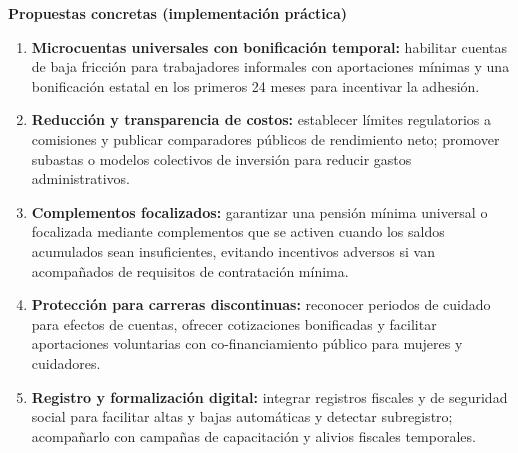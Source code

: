 \documentclass[11pt,letterpaper,oneside]{article}
\begin{document}
\begin{forobox}[title={Participación desarrollada — Temas 2 a 4}]
\medskip
\textbf{Propuestas concretas (implementación práctica)}
\begin{enumerate}
  \item \textbf{Microcuentas universales con bonificación temporal:} habilitar cuentas de baja fricción para trabajadores informales con aportaciones mínimas y una bonificación estatal en los primeros 24 meses para incentivar la adhesión.
  \item \textbf{Reducción y transparencia de costos:} establecer límites regulatorios a comisiones y publicar comparadores públicos de rendimiento neto; promover subastas o modelos colectivos de inversión para reducir gastos administrativos.
  \item \textbf{Complementos focalizados:} garantizar una pensión mínima universal o focalizada mediante complementos que se activen cuando los saldos acumulados sean insuficientes, evitando incentivos adversos si van acompañados de requisitos de contratación mínima.
  \item \textbf{Protección para carreras discontinuas:} reconocer periodos de cuidado para efectos de cuentas, ofrecer cotizaciones bonificadas y facilitar aportaciones voluntarias con co-financiamiento público para mujeres y cuidadores.
  \item \textbf{Registro y formalización digital:} integrar registros fiscales y de seguridad social para facilitar altas y bajas automáticas y detectar subregistro; acompañarlo con campañas de capacitación y alivios fiscales temporales.
\end{enumerate}

\end{forobox}
\end{document}
